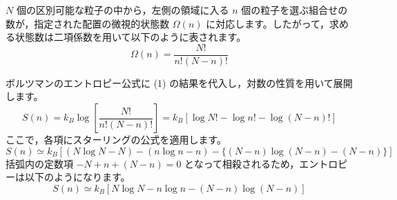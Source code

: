 \solutionheading
\begin{solutionparts}

$N$ 個の区別可能な粒子の中から，左側の領域に入る $n$ 個の粒子を選ぶ組合せの数が，指定された配置の微視的状態数 $\Omega(n)$ に対応します。したがって，求める状態数は二項係数を用いて以下のように表されます。
\begin{equation*}
\Omega(n) = \frac{N!}{n!(N-n)!}
\end{equation*}

ボルツマンのエントロピー公式に (1) の結果を代入し，対数の性質を用いて展開します。
\begin{equation*}
S(n) = k_B \log \left[ \frac{N!}{n!(N-n)!} \right] = k_B \left[ \log N! - \log n! - \log (N-n)! \right]
\end{equation*}
ここで，各項にスターリングの公式を適用します。
\begin{equation*}
S(n) \simeq k_B \left[ (N \log N - N) - (n \log n - n) - \{ (N-n) \log (N-n) - (N-n) \} \right]
\end{equation*}
括弧内の定数項 $-N + n + (N-n) = 0$ となって相殺されるため，エントロピーは以下のようになります。
\begin{equation*}
S(n) \simeq k_B \left[ N \log N - n \log n - (N-n) \log (N-n) \right]
\end{equation*}


\end{solutionparts}
